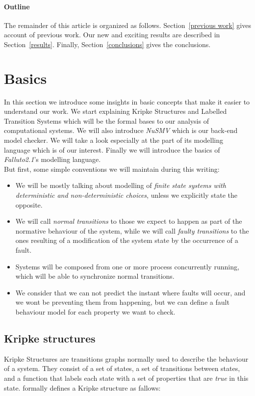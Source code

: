 \documentclass[12pt]{article}
\newcommand{\falluto}{\mbox{\textit{Falluto2.1}}}
\begin{document}
\paragraph{Outline}
The remainder of this article is organized as follows.
Section~\ref{previous work} gives account of previous work.
Our new and exciting results are described in Section~\ref{results}.
Finally, Section~\ref{conclusions} gives the conclusions.


\section{Basics}\label{basics}
In this section we introduce some insights in basic concepts that make it
easier to understand our work. We start explaining Kripke Structures and Labelled Transition Systems which will be the formal bases to our analysis of computational systems. We will also introduce \mbox{\textit{NuSMV}} which is our back-end model checker. We will take a look especially at the part of its modelling language which is of our interest. Finally we will introduce the basics of \falluto 's modelling language.\\
But first, some simple conventions we will maintain during this writing:
\begin{itemize}
\item We will be mostly talking about modelling of \textit{finite state systems with deterministic and non-deterministic choices}, unless we explicitly state the opposite.
\item We will call \textit{normal transitions} to those we expect to happen as part of the normative behaviour of the system, while we will call \textit{faulty transitions} to the ones resulting of a modification of the system state by the occurrence of a fault.
\item Systems will be composed from one or more process concurrently running, which will be able to synchronize normal transitions.
\item We consider that we can not predict the instant where faults will occur, and we wont be preventing them from happening, but we can define a fault behaviour model for each property we want to check.
\end{itemize}

\subsection{Kripke structures}\label{kripke}
Kripke Structures are transitions graphs normally used to describe the behaviour of a system. They consist of a set of states, a set of transitions between states, and a function that labels each state with a set of properties that are \textit{true} in this state. \cite{clarke} formally defines a Kripke structure as fallows:\\
\end{document}
